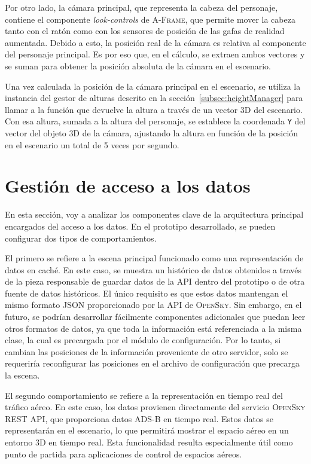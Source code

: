 \documentclass[a4paper, 11pt]{book}
\begin{document}
Por otro lado, la cámara principal, que representa la cabeza del personaje, contiene el componente \emph{look-controls} de \textsc{A-Frame}, que permite mover la cabeza tanto con el ratón como con los sensores de posición de las gafas de realidad aumentada.
Debido a esto, la posición real de la cámara es relativa al componente del personaje principal. Es por eso que, en el cálculo, se extraen ambos vectores y se suman para obtener la posición absoluta de la cámara en el escenario.

Una vez calculada la posición de la cámara principal en el escenario, se utiliza la instancia del gestor de alturas descrito en la sección~\ref{subsec:heightManager} para llamar a la función que devuelve la altura a través de un vector 3D del escenario. Con esa altura, sumada a la altura del personaje, se establece la coordenada \texttt{Y} del vector del objeto \textsc{3D} de la cámara, ajustando la altura en función de la posición en el escenario un total de 5 veces por segundo.

\section{Gestión de acceso a los datos}
\label{sec:data}
En esta sección, voy a analizar los componentes clave de la arquitectura principal encargados del acceso a los datos. En el prototipo desarrollado, se pueden configurar dos tipos de comportamientos.

El primero se refiere a la escena principal funcionado como una representación de datos en caché. En este caso, se muestra un histórico de datos obtenidos a través de la pieza responsable de guardar datos de la \textsc{API} dentro del prototipo o de otra fuente de datos históricos. 
El único requisito es que estos datos mantengan el mismo formato \textsc{\gls{JSON}} proporcionado por la \textsc{API} de \textsc{OpenSky}. Sin embargo, en el futuro, se podrían desarrollar fácilmente componentes adicionales que puedan leer otros formatos de datos, ya que toda la información está referenciada a la misma clase, la cual es precargada por el módulo de configuración. Por lo tanto, si cambian las posiciones de la información proveniente de otro servidor, solo se requeriría reconfigurar las posiciones en el archivo de configuración que precarga la escena.

El segundo comportamiento se refiere a la representación en tiempo real del tráfico aéreo. En este caso, los datos provienen directamente del servicio\textsc{ OpenSky REST API}, que proporciona datos \textsc{ADS-B} en tiempo real. Estos datos se representarán en el escenario, lo que permitirá mostrar el espacio aéreo en un entorno \textsc{3D} en tiempo real. Esta funcionalidad resulta especialmente útil como punto de partida para aplicaciones de control de espacios aéreos.
\end{document}
